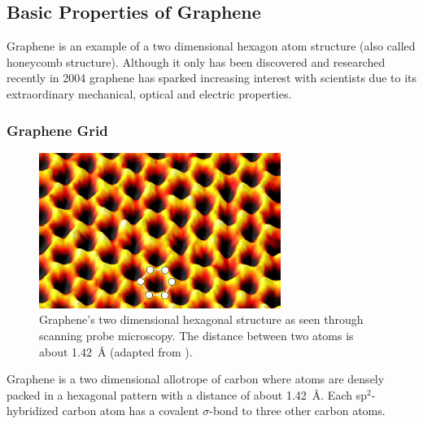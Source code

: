 \subsection{Basic Properties of Graphene}

Graphene is an example of a two dimensional hexagon atom structure (also called honeycomb structure). Although it only has been discovered and researched recently in 2004\cite{novoselov} graphene has sparked increasing interest with scientists due to its extraordinary mechanical, optical and electric properties.

\subsubsection{Graphene Grid}
\begin{figure}[!h]
  \centering
  \includegraphics[width=0.7\textwidth]{./images/graphene-spm.png}
  \caption{Graphene's two dimensional hexagonal structure as seen through scanning probe microscopy. The distance between two atoms is about \SI{1.42}{\angstrom} (adapted from \mcite).}
\end{figure}

Graphene is a two dimensional allotrope of carbon where atoms are densely packed in a hexagonal pattern with a distance of about \SI{1.42}{\angstrom}. Each sp$^2$-hybridized carbon atom has a covalent $\sigma$-bond to three other carbon atoms.

